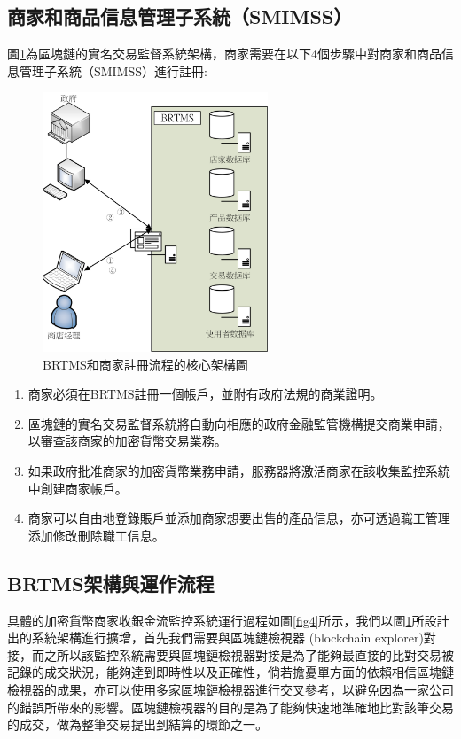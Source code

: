 	\subsection{商家和商品信息管理子系統（SMIMSS）}
	圖\ref{fig3}為區塊鏈的實名交易監督系統架構，商家需要在以下4個步驟中對商家和商品信息管理子系統（SMIMSS）進行註冊:

	\begin{figure}[htbp]
		\centering
		\includegraphics[width = 0.6\textwidth]{fig3.png}
		\caption{BRTMS和商家註冊流程的核心架構圖}\label{fig3}
	\end{figure}

	\begin{enumerate}
		\item 商家必須在BRTMS註冊一個帳戶，並附有政府法規的商業證明。
		\item 區塊鏈的實名交易監督系統將自動向相應的政府金融監管機構提交商業申請，以審查該商家的加密貨幣交易業務。
		\item 如果政府批准商家的加密貨幣業務申請，服務器將激活商家在該收集監控系統中創建商家帳戶。
		\item 商家可以自由地登錄賬戶並添加商家想要出售的產品信息，亦可透過職工管理添加修改刪除職工信息。
	\end{enumerate}

	\subsection{BRTMS架構與運作流程}
	具體的加密貨幣商家收銀金流監控系統運行過程如圖\ref{fig4}所示，我們以圖\ref{fig3}所設計出的系統架構進行擴增，首先我們需要與區塊鏈檢視器 (blockchain explorer)對接，而之所以該監控系統需要與區塊鏈檢視器對接是為了能夠最直接的比對交易被記錄的成交狀況，能夠達到即時性以及正確性，倘若擔憂單方面的依賴相信區塊鏈檢視器的成果，亦可以使用多家區塊鏈檢視器進行交叉參考，以避免因為一家公司的錯誤所帶來的影響。區塊鏈檢視器的目的是為了能夠快速地準確地比對該筆交易的成交，做為整筆交易提出到結算的環節之一。

